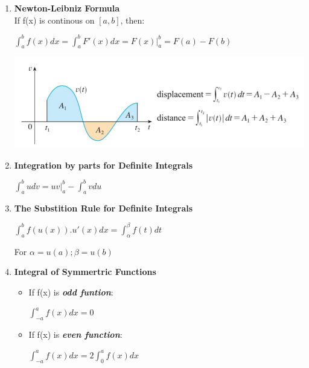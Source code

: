 \documentclass[10pt]{article}
\begin{document}
\begin{enumerate}
	\item \textbf{Newton-Leibniz Formula}\\
	If f(x) is continous on $\left[a,b\right]$, then:
	\begin{mybox}
	\begin{center}
	$\displaystyle \int_{a}^{b}f(x)dx = \int_{a}^{b}F'(x)dx = F(x) |_{a}^{b} = F(a) - F(b)$
	\end{center}
	\end{mybox}
	\includegraphics{hinh}
	\item \textbf{Integration by parts for Definite Integrals}\\
	\begin{mybox}
	\begin{center}
	$\displaystyle \int_{a}^{b}udv = uv|_{a}^{b} - \int_{a}^{b}vdu$
	\end{center}
	\end{mybox}
	\item \textbf{The Substition Rule for Definite Integrals}
	\begin{mybox}
	\begin{center}
	$\displaystyle \int_{a}^{b}f(u(x)).u'(x)dx = \int_{\alpha}^{\beta}f(t)dt$
	\end{center}
	\end{mybox}
	For $\alpha = u(a) ; \beta = u(b)$
	\item \textbf{Integral of Symmertric Functions}
	\begin{itemize}
		\item If f(x) is \textit{\textbf{odd funtion}}:
		\begin{mybox}
		\begin{center}
		$\displaystyle \int_{-a}^{a}f(x)dx = 0$
		\end{center}
		\end{mybox}
		\item If f(x) is \textit{\textbf{even function}}:
		\begin{mybox}
		\begin{center}
		$\displaystyle \int_{-a}^{a}f(x)dx = 2 \int_{0}^{a}f(x)dx$
		\end{center}
		\end{mybox}
	\end{itemize}
\end{enumerate}
\end{document}
